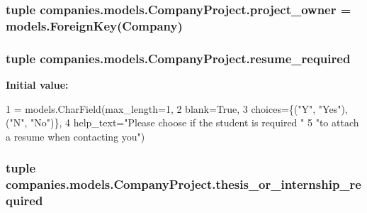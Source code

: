 \hypertarget{classcompanies_1_1models_1_1_company_project_afa051ee34a614cafc6e58adbad733eea}{
\subsubsection[{project\-\_\-owner}]{\setlength{\rightskip}{0pt plus 5cm}tuple companies.\-models.\-Company\-Project.\-project\-\_\-owner = models.\-Foreign\-Key({\bf Company})\hspace{0.3cm}{\ttfamily [static]}}}\label{classcompanies_1_1models_1_1_company_project_afa051ee34a614cafc6e58adbad733eea}
\hypertarget{classcompanies_1_1models_1_1_company_project_a510cc1d306089f11bd471729bd5fcdb6}{
\subsubsection[{resume\-\_\-required}]{\setlength{\rightskip}{0pt plus 5cm}tuple companies.\-models.\-Company\-Project.\-resume\-\_\-required\hspace{0.3cm}{\ttfamily [static]}}}\label{classcompanies_1_1models_1_1_company_project_a510cc1d306089f11bd471729bd5fcdb6}
{\bfseries Initial value\-:}
\begin{DoxyCode}
1 = models.CharField(max\_length=1,
2                                        blank=\textcolor{keyword}{True},
3                                        choices=\{(\textcolor{stringliteral}{"Y"}, \textcolor{stringliteral}{"Yes"}), (\textcolor{stringliteral}{"N"}, \textcolor{stringliteral}{"No"})\},
4                                        help\_text=\textcolor{stringliteral}{"Please choose if the student is required "}
5                                                  \textcolor{stringliteral}{"to attach a resume when contacting you"})
\end{DoxyCode}
\hypertarget{classcompanies_1_1models_1_1_company_project_ad59b58624bacc419f02c2be4880bd15e}{
\subsubsection[{thesis\-\_\-or\-\_\-internship\-\_\-required}]{\setlength{\rightskip}{0pt plus 5cm}tuple companies.\-models.\-Company\-Project.\-thesis\-\_\-or\-\_\-internship\-\_\-required\hspace{0.3cm}{\ttfamily [static]}}}\label{classcompanies_1_1models_1_1_company_project_ad59b58624bacc419f02c2be4880bd15e}
